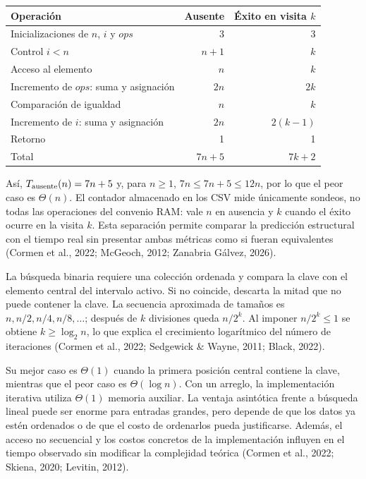 \begin{center}\small
\begin{tabular}{p{8.4cm}rr}
\toprule
Operación & Ausente & Éxito en visita $k$\\\midrule
Inicializaciones de $n$, $i$ y $ops$ & 3 & 3\\
Control $i<n$ & $n+1$ & $k$\\
Acceso al elemento & $n$ & $k$\\
Incremento de $ops$: suma y asignación & $2n$ & $2k$\\
Comparación de igualdad & $n$ & $k$\\
Incremento de $i$: suma y asignación & $2n$ & $2(k-1)$\\
Retorno & 1 & 1\\\midrule
Total & $7n+5$ & $7k+2$\\\bottomrule
\end{tabular}\end{center}

Así, $T_{\rm ausente}(n)=7n+5$ y, para $n\ge1$, $7n\le7n+5\le12n$, por lo que el peor caso es $\Theta(n)$. El contador almacenado en los CSV mide únicamente sondeos, no todas las operaciones del convenio RAM: vale $n$ en ausencia y $k$ cuando el éxito ocurre en la visita $k$. Esta separación permite comparar la predicción estructural con el tiempo real sin presentar ambas métricas como si fueran equivalentes (Cormen et al., 2022; McGeoch, 2012; Zanabria Gálvez, 2026).

La búsqueda binaria requiere una colección ordenada y compara la clave con el elemento central del intervalo activo. Si no coincide, descarta la mitad que no puede contener la clave. La secuencia aproximada de tamaños es $n,n/2,n/4,n/8,\ldots$; después de $k$ divisiones queda $n/2^k$. Al imponer $n/2^k\le1$ se obtiene $k\ge\log_2 n$, lo que explica el crecimiento logarítmico del número de iteraciones (Cormen et al., 2022; Sedgewick \& Wayne, 2011; Black, 2022).

Su mejor caso es $\Theta(1)$ cuando la primera posición central contiene la clave, mientras que el peor caso es $\Theta(\log n)$. Con un arreglo, la implementación iterativa utiliza $\Theta(1)$ memoria auxiliar. La ventaja asintótica frente a búsqueda lineal puede ser enorme para entradas grandes, pero depende de que los datos ya estén ordenados o de que el costo de ordenarlos pueda justificarse. Además, el acceso no secuencial y los costos concretos de la implementación influyen en el tiempo observado sin modificar la complejidad teórica (Cormen et al., 2022; Skiena, 2020; Levitin, 2012).

